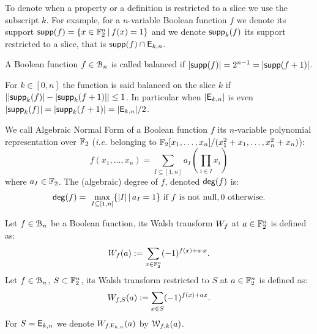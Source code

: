 \documentclass[11pt]{llncs}
\begin{document}
To denote when a property or a definition is restricted to a slice we use the subscript $k$. 
For example, for a $n$-variable Boolean function $f$ we denote its support $\mathsf{supp}(f)=\{x\in \mathbb{F}_2^n \, | \, f(x)=1  \}$ and we denote $\mathsf{supp}_{k}(f)$ its support restricted to a slice, that is $\mathsf{supp}(f)\cap \mathsf{E}_{k,n}$.


\begin{definition}[Balancedness]\label{def:balancedness}
	A Boolean function $f\in \mathcal{B}_n$ is called balanced if $|\mathsf{supp}(f)|=2^{n-1}=|\mathsf{supp}(f+1)|$. 
	
	For $k\in [0,n]$ the function is said balanced on the slice $k$ if $||\mathsf{supp}_{k}(f)|-|\mathsf{supp}_{k}(f+1)| |\le 1$. In particular when $|\mathsf{E}_{k,n}|$ is even $|\mathsf{supp}_{k}(f)|=|\mathsf{supp}_{k}(f+1)|=|\mathsf{E}_{k,n}|/2$.
\end{definition}

\begin{definition}\label{def:anf}
	We call Algebraic Normal Form of a Boolean function $f$ its $n$-variable polynomial representation over $\mathbb{F}_2$ (\textit{i.e.} belonging to $\mathbb{F}_2[x_1,\dots,x_n]/(x_1^2+x_1,\dots,x_n^2+x_n)$):
	\[f(x_1,\dots,x_n)= \sum_{I \subseteq [1,n]} a_I \left( \prod_{i \in I} x_i \right) \]%
	where $a_I\in \mathbb{F}_2$. 	
	The (algebraic) degree of $f$, denoted $\mathsf{deg}(f)$ is: \[\mathsf{deg}(f)=\
	\max_{I\subseteq [1,n]}\{ |I|\, | \, a_I=1\}  \text{ if $f$ is not null},0  \text{ otherwise}.\]
\end{definition}




\begin{definition}\label{def:walsh_transform}
	Let $f\in \mathcal{B}_{n}$ be a Boolean function, its Walsh transform $W_{f}$ at $a \in \mathbb{F}_2^n$ is defined as:
	\[  W_{f} (a) := \sum_{x \in \mathbb{F}_2^n} (-1)^{f(x) +  a \cdot x }.\]
	Let $f\in \mathcal{B}_{n}$, $S \subset \mathbb{F}_2^n$, its Walsh transform restricted to $S$ at $a \in \mathbb{F}_2^n$ is defined as:
	\[  W_{f,S} (a) := \sum_{x\in S} (-1)^{f(x)+ax}.\]
	For $S=\mathsf{E}_{k,n}$ we denote $W_{f,\mathsf{E}_{k,n}} (a)$ by $\mathcal{W}_{f,k}(a)$.%
\end{definition}


	


\end{document}
